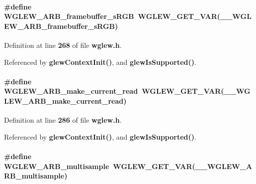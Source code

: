 \paragraph[{W\+G\+L\+E\+W\+\_\+\+A\+R\+B\+\_\+framebuffer\+\_\+s\+R\+GB}]{\setlength{\rightskip}{0pt plus 5cm}\#define W\+G\+L\+E\+W\+\_\+\+A\+R\+B\+\_\+framebuffer\+\_\+s\+R\+GB~{\bf W\+G\+L\+E\+W\+\_\+\+G\+E\+T\+\_\+\+V\+AR}({\bf \+\_\+\+\_\+\+W\+G\+L\+E\+W\+\_\+\+A\+R\+B\+\_\+framebuffer\+\_\+s\+R\+GB})}\label{wglew_8h_ae16f7c226228338e79b21a3d8da78f1d}


Definition at line {\bf 268} of file {\bf wglew.\+h}.



Referenced by {\bf glew\+Context\+Init()}, and {\bf glew\+Is\+Supported()}.

\paragraph[{W\+G\+L\+E\+W\+\_\+\+A\+R\+B\+\_\+make\+\_\+current\+\_\+read}]{\setlength{\rightskip}{0pt plus 5cm}\#define W\+G\+L\+E\+W\+\_\+\+A\+R\+B\+\_\+make\+\_\+current\+\_\+read~{\bf W\+G\+L\+E\+W\+\_\+\+G\+E\+T\+\_\+\+V\+AR}({\bf \+\_\+\+\_\+\+W\+G\+L\+E\+W\+\_\+\+A\+R\+B\+\_\+make\+\_\+current\+\_\+read})}\label{wglew_8h_a86ad8028c5d2ea15f1614ed7f131cb71}


Definition at line {\bf 286} of file {\bf wglew.\+h}.



Referenced by {\bf glew\+Context\+Init()}, and {\bf glew\+Is\+Supported()}.

\paragraph[{W\+G\+L\+E\+W\+\_\+\+A\+R\+B\+\_\+multisample}]{\setlength{\rightskip}{0pt plus 5cm}\#define W\+G\+L\+E\+W\+\_\+\+A\+R\+B\+\_\+multisample~{\bf W\+G\+L\+E\+W\+\_\+\+G\+E\+T\+\_\+\+V\+AR}({\bf \+\_\+\+\_\+\+W\+G\+L\+E\+W\+\_\+\+A\+R\+B\+\_\+multisample})}\label{wglew_8h_a2793b6d184dec3ac5c38a3b0f2feff46}


